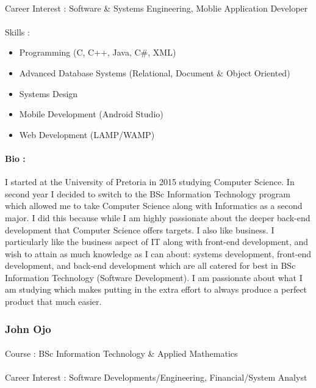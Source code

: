 \documentclass[11pt]{article}
\begin{document}
\paragraph{}Career Interest : Software & Systems Engineering, Moblie Application Developer 
\paragraph{}Skills : 
\begin{itemize}
\item Programming (C, C++, Java, C\#, XML)
\item Advanced Database Systems (Relational, Document \& Object Oriented)
\item Systems Design
\item Mobile Development (Android Studio)
\item Web Development (LAMP/WAMP)
\end{itemize}
\paragraph{Bio :}I started at the University of Pretoria in 2015 studying Computer Science. In second year I decided to switch to the BSc Information Technology program which allowed me to take Computer Science along with Informatics as a second major. I did this because while I am highly passionate about the deeper back-end development that Computer Science offers targets. I also like business. I particularly like the business aspect of IT along with front-end development, and wish to attain as much knowledge as I can about: systems development, front-end development, and back-end development which are all catered for best in BSc Information Technology (Software Development). I am passionate about what I am studying which makes putting in the extra effort to always produce a perfect product that much easier. 

\subsubsection{John Ojo}
\paragraph{}Course : BSc Information Technology \& Applied Mathematics
\paragraph{}Career Interest : Software Developments/Engineering, Financial/System Analyst
\end{document}
